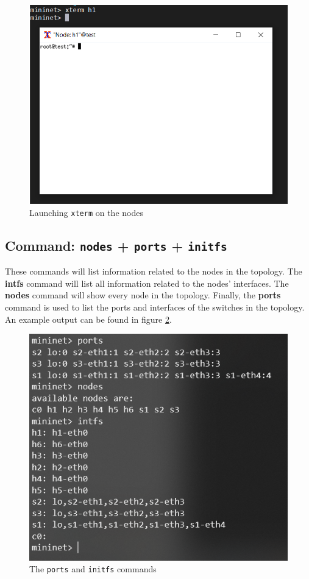 \documentclass[12pt]{report}
\begin{document}
\begin{itemize}
{{{{			\begin{figure}
				\centering
				\includegraphics[scale = 1]{xterm.png}
				\caption{Launching \texttt{xterm} on the nodes}
				\label{f:xterm}
			\end{figure}

		\subsection{Command: \texttt{nodes} + \texttt{ports} + \texttt{initfs}}
			These commands will list information related to the nodes in the topology. The \textbf{intfs} command will list all information related to the nodes' interfaces. The  \textbf{nodes} command will show every node in the topology. Finally, the \textbf{ports} command is used to list the ports and interfaces of the switches in the topology. An example output can be found in figure \ref{f:initfs}.

			\begin{figure}
				\centering
				\includegraphics[scale = 1]{initfs_cmd.png}
				\caption{The \texttt{ports} and \texttt{initfs} commands}
				\label{f:initfs}
			\end{figure}

}}}}
\end{itemize}
\end{document}
